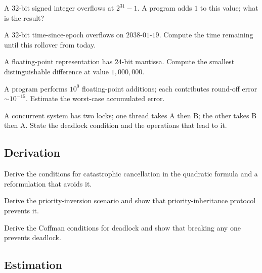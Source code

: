 \begin{exercise}
A 32-bit signed integer overflows at $2^{31} - 1$. A program adds $1$ to this value; what is the result?
\end{exercise}

\begin{exercise}
A $32$-bit time-since-epoch overflows on $2038$-$01$-$19$. Compute the time remaining until this rollover from today.
\end{exercise}

\begin{exercise}
A floating-point representation has $24$-bit mantissa. Compute the smallest distinguishable difference at value $1{,}000{,}000$.
\end{exercise}

\begin{exercise}
A program performs $10^9$ floating-point additions; each contributes round-off error $\sim 10^{-15}$. Estimate the worst-case accumulated error.
\end{exercise}

\begin{exercise}
A concurrent system has two locks; one thread takes A then B; the other takes B then A. State the deadlock condition and the operations that lead to it.
\end{exercise}

\subsection*{Derivation}

\begin{exercise}
Derive the conditions for catastrophic cancellation in the quadratic formula and a reformulation that avoids it.
\end{exercise}

\begin{exercise}
Derive the priority-inversion scenario and show that priority-inheritance protocol prevents it.
\end{exercise}

\begin{exercise}
Derive the Coffman conditions for deadlock and show that breaking any one prevents deadlock.
\end{exercise}

\subsection*{Estimation}

